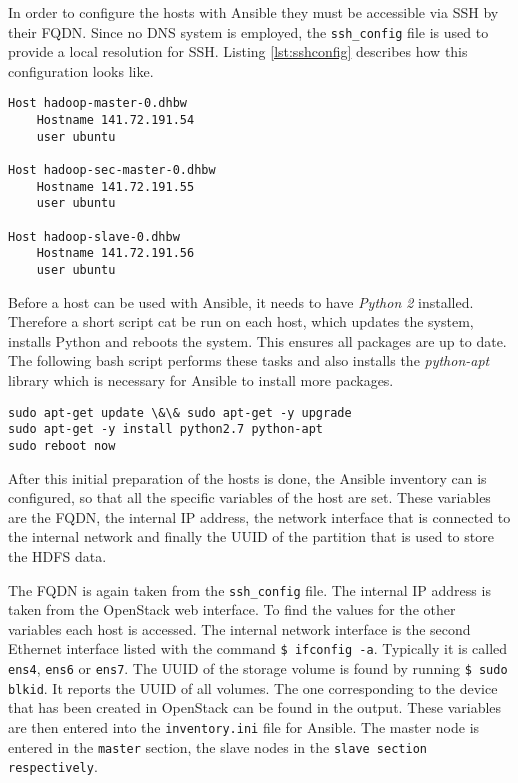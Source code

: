 In order to configure the hosts with Ansible they must be accessible via \ac{SSH} by their \ac{FQDN}. 
Since no \ac{DNS} system is employed, the \texttt{ssh\_config} file is used to provide a local resolution for \ac{SSH}. 
Listing \ref{lst:sshconfig} describes how this configuration looks like.

\lstset{language=sh}
\begin{lstlisting}[caption={Local SSH configuration file used by Ansible}, label={lst:sshconfig}]
Host hadoop-master-0.dhbw
    Hostname 141.72.191.54
    user ubuntu

Host hadoop-sec-master-0.dhbw
    Hostname 141.72.191.55
    user ubuntu

Host hadoop-slave-0.dhbw
    Hostname 141.72.191.56
    user ubuntu
\end{lstlisting}

Before a host can be used with Ansible, it needs to have \emph{Python 2} installed.
Therefore a short script cat be run on each host, which updates the system, installs Python and reboots the system. This ensures all packages are up to date. The following bash script performs these tasks and also installs the \emph{python-apt} library which is necessary for Ansible to install more packages.

\lstset{language=sh}
\begin{lstlisting}[caption={Bash script for initial host preparation}, label={lst:hostsetup}]
sudo apt-get update \&\& sudo apt-get -y upgrade
sudo apt-get -y install python2.7 python-apt
sudo reboot now
\end{lstlisting}

After this initial preparation of the hosts is done, 
the Ansible inventory can is configured, 
so that all the specific variables of the host are set. 
These variables are the \ac{FQDN}, the internal \ac{IP} address, 
the network interface that is connected to the internal network 
and finally the \ac{UUID} of the partition that is used to store the \ac{HDFS} data.

The \ac{FQDN} is again taken from the \texttt{ssh\_config} file. 
The internal \ac{IP} address is taken from the OpenStack web interface.
To find the values for the other variables each host is accessed.
The internal network interface is the second Ethernet interface listed with the command \texttt{\$ ifconfig -a}. Typically it is called \texttt{ens4}, \texttt{ens6} or \texttt{ens7}.
The \ac{UUID} of the storage volume is found by running \texttt{\$ sudo blkid}. 
It reports the \ac{UUID} of all volumes. The one corresponding to the device that has been created in OpenStack can be found in the output. These variables are then entered into the \texttt{inventory.ini} file for Ansible. The master node is entered in the \texttt{master} section, the slave nodes in the \texttt{slave section respectively}.

